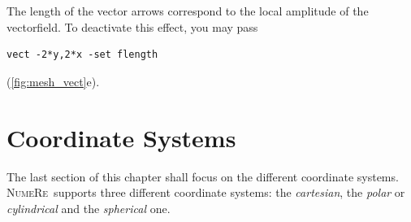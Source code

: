 \documentclass[DIV=14,headsepline,footsepline]{scrbook}
\newcommand{\NR}{\textsc{Nu\-me\-Re}}
\begin{document}
				The length of the vector arrows correspond to the local amplitude of the vectorfield. To deactivate this effect, you may pass
				\begin{lstlisting}
vect -2*y,2*x -set flength
				\end{lstlisting}
				(\autoref{fig:mesh_vect}e).
				
			\section{Coordinate Systems}
				The last section of this chapter shall focus on the different coordinate systems. \NR\ supports three different coordinate systems: the \emph{cartesian}, the \emph{polar} or \emph{cylindrical} and the \emph{spherical} one.
				\begin{figure}[htb]%
					\centering
					\\

\end{figure}
\end{document}
